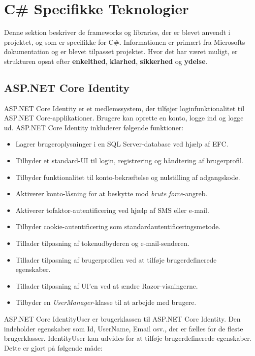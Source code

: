 \section{C\# Specifikke Teknologier}
Denne sektion beskriver de frameworks og libraries, der er blevet anvendt i projektet, og som er specifikke for C\#. Informationen er primært fra Microsofts dokumentation og er blevet tilpasset projektet. 
Hvor det har været muligt, er strukturen opsat efter \textbf{enkelthed}, \textbf{klarhed}, \textbf{sikkerhed} og \textbf{ydelse}. 

\subsection{ASP.NET Core Identity}
ASP.NET Core Identity er et medlemssystem, der tilføjer loginfunktionalitet til ASP.NET Core-applikationer. Brugere kan oprette en konto, logge ind og logge ud. ASP.NET Core Identity inkluderer følgende funktioner:
\begin{itemize}
\item Lagrer brugeroplysninger i en SQL Server-database ved hjælp af EFC.
\item Tilbyder et standard-UI til login, registrering og håndtering af brugerprofil.
\item Tilbyder funktionalitet til konto-bekræftelse og nulstilling af adgangskode.
\item Aktiverer konto-låsning for at beskytte mod \emph{brute force}-angreb.
\item Aktiverer tofaktor-autentificering ved hjælp af SMS eller e-mail.
\item Tilbyder cookie-autentificering som standardautentificeringsmetode.
\item Tillader tilpasning af tokenudbyderen og e-mail-senderen.
\item Tillader tilpasning af brugerprofilen ved at tilføje brugerdefinerede egenskaber.
\item Tillader tilpasning af UI'en ved at ændre Razor-visningerne.
\item Tilbyder en \emph{UserManager}-klasse til at arbejde med brugere.
\end{itemize}
ASP.NET Core IdentityUser er brugerklassen til ASP.NET Core Identity. Den indeholder egenskaber som Id, UserName, Email osv., der er fælles for de fleste brugerklasser. IdentityUser kan udvides for at tilføje brugerdefinerede egenskaber. Dette er gjort på følgende måde:
